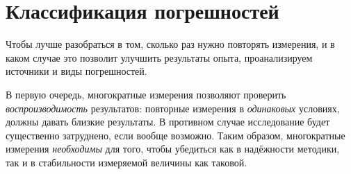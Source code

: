 \enlargethispage{1em}



\section{Классификация погрешностей}

Чтобы лучше разобраться в том, сколько раз нужно повторять измерения,
и в каком случае это позволит улучшить результаты опыта,
проанализируем источники и виды погрешностей.

В первую очередь, многократные измерения позволяют проверить
\emph{воспроизводимость} результатов: повторные измерения в \emph{одинаковых}
условиях, должны давать близкие результаты. В противном случае
исследование будет существенно затруднено, если вообще возможно.
Таким образом, многократные измерения \emph{необходимы} для того,
чтобы убедиться как в надёжности методики, так и в стабильности измеряемой
величины как таковой.

